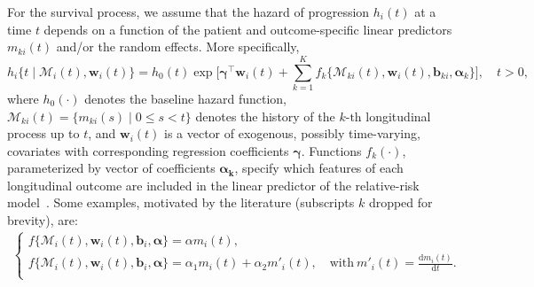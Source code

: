 For the survival process, we assume that the hazard of progression $h_i(t)$ at a time $t$ depends on a function of the patient and outcome-specific linear predictors $m_{ki}(t)$ and/or the random effects. More specifically,
\begin{equation}
\label{eq:rel_risk_model}
h_i\big\{t \mid \mathcal{M}_i(t), \boldsymbol{w}_i(t)\big\} = h_0(t) \exp\Big[\boldsymbol{\gamma}^{\top}\boldsymbol{w}_i(t) + \sum_{k=1}^{K} f_{k} \big\{ \mathcal{M}_{ki}(t), \boldsymbol{w}_i(t), \boldsymbol{b}_{ki}, \boldsymbol{\alpha}_{k} \big\}\Big], \quad t>0,
\end{equation}
where $h_0(\cdot)$ denotes the baseline hazard function, $\mathcal{M}_{ki}(t)=\{m_{ki}(s) \mid 0 \leq s < t \}$ denotes the history of the ${k\mbox{-th}}$ longitudinal process up to $t$, and $\boldsymbol{w}_i(t)$ is a vector of exogenous, possibly time-varying, covariates with corresponding regression coefficients $\boldsymbol{\gamma}$. Functions $f_{k}(\cdot)$, parameterized by vector of coefficients $\boldsymbol{\alpha_{k}}$, specify which features of each longitudinal outcome are included in the linear predictor of the relative-risk model~\citep{brown2009assessing,rizopoulos2012joint,taylor2013real}. Some examples, motivated by the literature (subscripts $k$ dropped for brevity), are:
\begin{eqnarray*}
\left \{
\begin{array}{l}
f\big\{\mathcal{M}_{i}(t), \boldsymbol{w}_i(t), \boldsymbol{b}_{i}, \boldsymbol{\alpha} \big\} = \alpha m_{i}(t),\\
f\big\{ \mathcal{M}_{i}(t), \boldsymbol{w}_i(t), \boldsymbol{b}_{i}, \boldsymbol{\alpha}\big\} = \alpha_1 m_{i}(t) + \alpha_2 m'_{i}(t),\quad \text{with}\  m'_{i}(t) = \frac{\mathrm{d}{m_{i}(t)}}{\mathrm{d}{t}}.\\
\end{array}
\right.
\end{eqnarray*}
